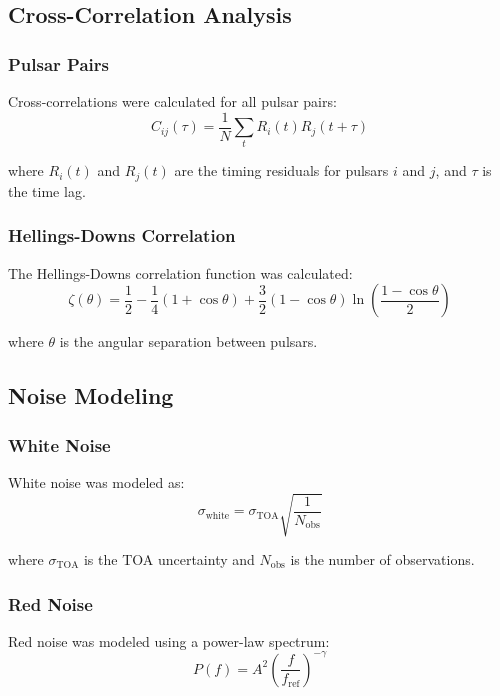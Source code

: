 \subsection{Cross-Correlation Analysis}

\subsubsection{Pulsar Pairs}
Cross-correlations were calculated for all pulsar pairs:
\begin{equation}
C_{ij}(\tau) = \frac{1}{N} \sum_{t} R_i(t) R_j(t+\tau)
\end{equation}

where $R_i(t)$ and $R_j(t)$ are the timing residuals for pulsars $i$ and $j$, and $\tau$ is the time lag.

\subsubsection{Hellings-Downs Correlation}
The Hellings-Downs correlation function was calculated:
\begin{equation}
\zeta(\theta) = \frac{1}{2} - \frac{1}{4} \left(1 + \cos\theta\right) + \frac{3}{2} \left(1 - \cos\theta\right) \ln\left(\frac{1 - \cos\theta}{2}\right)
\end{equation}

where $\theta$ is the angular separation between pulsars.

\subsection{Noise Modeling}

\subsubsection{White Noise}
White noise was modeled as:
\begin{equation}
\sigma_{\text{white}} = \sigma_{\text{TOA}} \sqrt{\frac{1}{N_{\text{obs}}}}
\end{equation}

where $\sigma_{\text{TOA}}$ is the TOA uncertainty and $N_{\text{obs}}$ is the number of observations.

\subsubsection{Red Noise}
Red noise was modeled using a power-law spectrum:
\begin{equation}
P(f) = A^2 \left(\frac{f}{f_{\text{ref}}}\right)^{-\gamma}
\end{equation}

